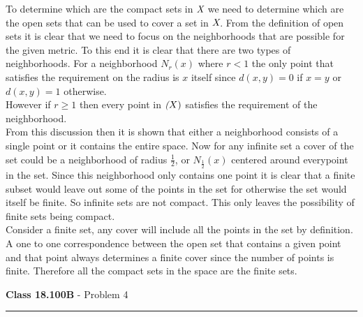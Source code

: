 \documentclass[11pt,reqno]{article}
\begin{document}
To determine which are the compact sets in $\emph{X}$ we need to determine which are the open sets that can be used to cover a set in $\emph{X}$.
From the definition of open sets it is clear that we need to focus on the neighborhoods that are possible for the given metric. To this end it is clear that there are two types of neighborhoods. For a neighborhood $N_r(x)$ where $r < 1$ the only point that satisfies the requirement on the radius is $x$ itself since $d(x,y) = 0$ if $x = y$ or $d(x,y) = 1$ otherwise.  \\
\indent However if $r \ge 1$ then every point in $\emph(X)$ satisfies the requirement of the neighborhood.\\
\indent From this discussion then it is shown that either a neighborhood consists of a single point or it contains the entire space. Now for any infinite set a cover of the set could be a neighborhood of radius $\frac{1}{2}$, or $N_{\frac{1}{2}}(x)$ centered around everypoint in the set. Since this neighborhood only contains one point it is clear that a finite subset would leave out some of the points in the set for otherwise the set would itself be finite. So infinite sets are not compact. This only leaves the possibility of finite sets being compact. \\
\indent Consider a finite set, any cover will include all the points in the set by definition. A one to one correspondence between the open set that contains a given point and that point always determines a finite cover since the number of points is finite. Therefore all the compact sets in the space are the finite sets.

\vspace{15pt}
\begin{flushleft} 
\textbf{Class 18.100B} - Problem 4\\
\rule{500pt}{1pt}\\
\end{flushleft} 
\end{document}
